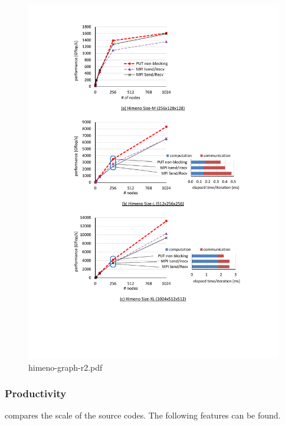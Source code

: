 \begin{figure}[p]
  \begin{center}
    \mbox{\includegraphics[trim=35mm 47mm 30mm 14mm, scale=0.75,clip]{figs/himeno-graph-r7.pdf}}
    \caption{himeno-graph-r2.pdf}\label{fig:himeno-graph}
  \end{center}
\end{figure}


\subsubsection{Productivity}

 compares the scale of the source codes. 
The following features can be found.

